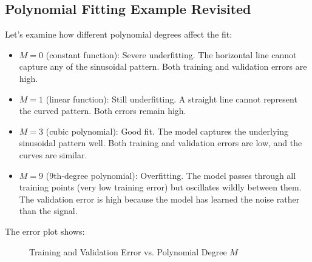 \documentclass[11pt,a4paper]{article}
\theoremstyle{definition}
\theoremstyle{plain}
\theoremstyle{remark}
\begin{document}
\subsection{Polynomial Fitting Example Revisited}

Let's examine how different polynomial degrees affect the fit:

\begin{itemize}
    \item \textbf{$M = 0$} (constant function): Severe underfitting. The horizontal line cannot capture any of the sinusoidal pattern. Both training and validation errors are high.
    
    \item \textbf{$M = 1$} (linear function): Still underfitting. A straight line cannot represent the curved pattern. Both errors remain high.
    
    \item \textbf{$M = 3$} (cubic polynomial): Good fit. The model captures the underlying sinusoidal pattern well. Both training and validation errors are low, and the curves are similar.
    
    \item \textbf{$M = 9$} (9th-degree polynomial): Overfitting. The model passes through all training points (very low training error) but oscillates wildly between them. The validation error is high because the model has learned the noise rather than the signal.
\end{itemize}

The error plot shows:

\begin{figure}[h]
\centering
{}
\caption{Training and Validation Error vs. Polynomial Degree $M$}
\end{figure}
\end{document}

